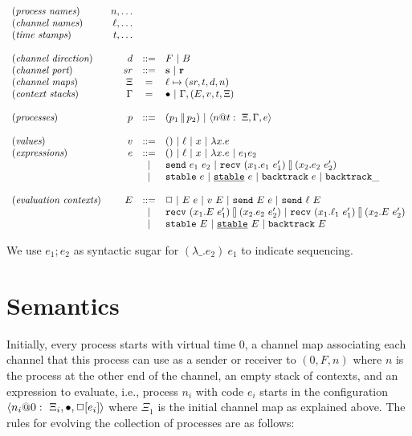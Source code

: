\documentclass{article}
\begin{document}
\[\begin{array}{lrcl}
(\textit{process names}) & n, \ldots \\
(\textit{channel names}) & \ell, \ldots \\
(\textit{time stamps}) & t, \ldots \\
\\
(\textit{channel direction}) & d &::=& F \alt B \\
(\textit{channel port}) & sr &::=& \textbf{s} \alt \textbf{r} \\
(\textit{channel maps}) & \Xi &=& \ell \mapsto (sr,t,d,n) \\
(\textit{context stacks}) & \Gamma &=& \bullet \alt \Gamma,(E,v,t,\Xi) \\
\\
(\textit{processes}) & p &::=& (\parc{p_1}{p_2}) \alt \proc{n}{\Gamma}{\Xi}{e}{t} \\
\\
(\textit{values}) & v &::=& () \alt \ell \alt x \alt \lambda x.e \\
(\textit{expressions}) & e &::=& () \alt \ell \alt x \alt \lambda x.e 
  \alt e_1e_2 \\
  &&\alt& \send{e_1}{e_2} \alt \recv{x_1}{e_1}{x_2}{e_2}{e'_1}{e'_2} \\
  &&\alt& \stable{e} \alt \stableu{e} \alt \backtrack{e} \alt \abacktrack \\
\\
(\textit{evaluation contexts}) & E &::=& \Box \alt E~e \alt v~E \alt 
  \send{E}{e} \alt \send{\ell}{E} \\
  &&\alt& \recv{x_1}{E}{x_2}{e_2}{e'_1}{e'_2} \alt 
      \recv{x_1}{\ell_1}{x_2}{E}{e'_1}{e'_2} \\
  &&\alt& \stable{E} \alt \stableu{E} \alt \backtrack{E}
\end{array}\]

We use $e_1;e_2$ as syntactic sugar for $(\lambda \_.e_2)~e_1$ to indicate
sequencing.

\section{Semantics} 

Initially, every process starts with virtual time 0, a channel map
associating each channel that this process can use as a sender or receiver to
$(0,F,n)$ where $n$ is the process at the other end of the channel, an empty
stack of contexts, and an expression to evaluate, i.e., process $n_i$ with
code $e_i$ starts in the configuration
$\proc{n_i}{\bullet}{\Xi_i}{\Box[e_i]}{0}$ where $\Xi_1$ is the initial
channel map as explained above. The rules for evolving the collection of
processes are as follows:
\end{document}
